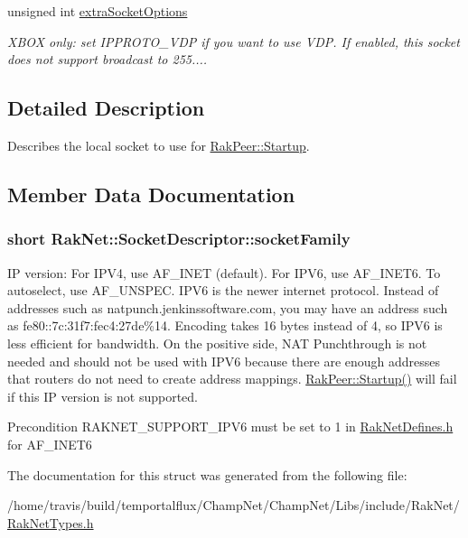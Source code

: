 \begin{DoxyCompactItemize}
\item 
\hypertarget{struct_rak_net_1_1_socket_descriptor_a7e793dfc857f28b172abbfa0f1ae4acc}{unsigned int \hyperlink{struct_rak_net_1_1_socket_descriptor_a7e793dfc857f28b172abbfa0f1ae4acc}{extra\-Socket\-Options}}\label{struct_rak_net_1_1_socket_descriptor_a7e793dfc857f28b172abbfa0f1ae4acc}

\begin{DoxyCompactList}\small\item\em X\-B\-O\-X only\-: set I\-P\-P\-R\-O\-T\-O\-\_\-\-V\-D\-P if you want to use V\-D\-P. If enabled, this socket does not support broadcast to 255.... \end{DoxyCompactList}\end{DoxyCompactItemize}


\subsection{Detailed Description}
Describes the local socket to use for \hyperlink{class_rak_net_1_1_rak_peer_a92d493cb617381a6e750f7df6e768927}{Rak\-Peer\-::\-Startup}. 

\subsection{Member Data Documentation}
\hypertarget{struct_rak_net_1_1_socket_descriptor_a5d55b4ee9ae18d738ed6066198205a21}{
\subsubsection[{socket\-Family}]{\setlength{\rightskip}{0pt plus 5cm}short Rak\-Net\-::\-Socket\-Descriptor\-::socket\-Family}}\label{struct_rak_net_1_1_socket_descriptor_a5d55b4ee9ae18d738ed6066198205a21}
I\-P version\-: For I\-P\-V4, use A\-F\-\_\-\-I\-N\-E\-T (default). For I\-P\-V6, use A\-F\-\_\-\-I\-N\-E\-T6. To autoselect, use A\-F\-\_\-\-U\-N\-S\-P\-E\-C. I\-P\-V6 is the newer internet protocol. Instead of addresses such as natpunch.\-jenkinssoftware.\-com, you may have an address such as fe80\-:\-:7c\-:31f7\-:fec4\-:27de\%14. Encoding takes 16 bytes instead of 4, so I\-P\-V6 is less efficient for bandwidth. On the positive side, N\-A\-T Punchthrough is not needed and should not be used with I\-P\-V6 because there are enough addresses that routers do not need to create address mappings. \hyperlink{class_rak_net_1_1_rak_peer_a92d493cb617381a6e750f7df6e768927}{Rak\-Peer\-::\-Startup()} will fail if this I\-P version is not supported. \begin{DoxyPrecond}{Precondition}
R\-A\-K\-N\-E\-T\-\_\-\-S\-U\-P\-P\-O\-R\-T\-\_\-\-I\-P\-V6 must be set to 1 in \hyperlink{_rak_net_defines_8h_source}{Rak\-Net\-Defines.\-h} for A\-F\-\_\-\-I\-N\-E\-T6 
\end{DoxyPrecond}


The documentation for this struct was generated from the following file\-:\begin{DoxyCompactItemize}
\item 
/home/travis/build/temportalflux/\-Champ\-Net/\-Champ\-Net/\-Libs/include/\-Rak\-Net/\hyperlink{_rak_net_types_8h}{Rak\-Net\-Types.\-h}\end{DoxyCompactItemize}
